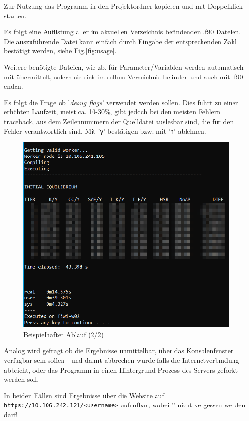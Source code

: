 \documentclass[11pt, a4paper]{article}
\begin{document}
Zur Nutzung das Programm in den Projektordner kopieren und mit Doppelklick starten.

Es folgt eine Auflistung aller im aktuellen Verzeichnis befindenden .f90 Dateien.
Die auszuführende Datei kann einfach durch Eingabe der entsprechenden Zahl bestätigt werden, siehe Fig.\ref{fig:usage}.

Weitere benötigte Dateien, wie zb. für Parameter/Variablen werden automatisch mit übermittelt, sofern sie sich im selben Verzeichnis befinden und auch mit .f90 enden.

Es folgt die Frage ob '\emph{debug flags}' verwendet werden sollen.
Dies führt zu einer erhöhten Laufzeit, meist ca. 10-30\%, gibt jedoch bei den meisten Fehlern traceback, aus dem Zeilennummern der Quelldatei auslesbar sind, die für den Fehler verantwortlich sind.
Mit '\texttt{y}' bestätigen bzw. mit '\texttt{n}' ablehnen.

\begin{figure}[h]
    \centering
    \includegraphics[width=0.7\linewidth]{./pics/2022-03-09_00-05.png}
    \caption{Beispielhafter Ablauf (2/2)}
    \label{fig:usage-full}
\end{figure}

Analog wird gefragt ob die Ergebnisse unmittelbar, über das Konsolenfenster verfügbar sein sollen - und damit abbrechen würde falls die Internetverbindung abbricht, oder das Programm in einen Hintergrund Prozess des Servers geforkt werden soll.

In beiden Fällen sind Ergebnisse über die Website auf \texttt{https://10.106.242.121/\raisebox{0.5ex}{\texttildelow}<username>} aufrufbar, wobei '\texttt{\raisebox{0.5ex}{\texttildelow}}' nicht vergessen werden darf!
\end{document}
